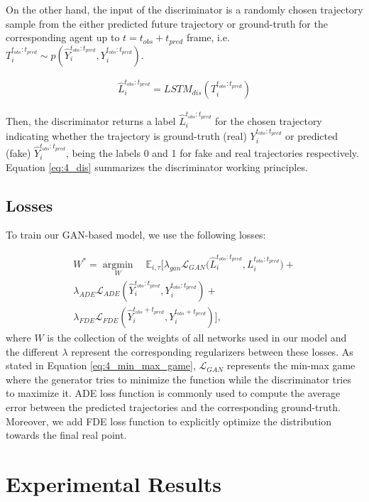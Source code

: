 On the other hand, the input of the discriminator is a randomly chosen trajectory sample from the either predicted future trajectory or ground-truth for the corresponding agent up to $t = t_{obs} + t_{pred}$ frame, i.e.  $T_i^{t_{obs}:t_{pred}}\sim p(\hat{Y}_i^{t_{obs}:t_{pred}},Y_i^{t_{obs}:t_{pred}})$.

\begin{eqnarray}
	\label{eq:4_dis}
	\hat{L}_{i}^{t_{obs}:t_{pred}} = LSTM_{dis}(T_i^{t_{obs}:t_{pred}})
\end{eqnarray}

Then, the discriminator returns a label $\hat{L}_{i}^{t_{obs}:t_{pred}}$ for the chosen trajectory indicating whether the trajectory is ground-truth (real) $Y_i^{t_{obs}:t_{pred}}$ or predicted (fake) $\hat{Y}_i^{t_{obs}:t_{pred}}$, being the labels 0 and 1 for fake and real trajectories respectively. Equation \ref{eq:4_dis} summarizes the discriminator working principles. 

\subsection{Losses}
\label{subsec:5_losses}

To train our \ac{GAN}-based model, we use the following losses:

\begin{eqnarray}
	\label{eq:obj}
	W^* =\operatorname*{argmin}_W \quad\mathbb{E}_{i,\tau}[\lambda_{gan} \mathcal{L}_{GAN}\big(\hat{L}_{i}^{t_{obs}:t_{pred}}, L_{i}^{t_{obs}:t_{pred}} \big)+ \nonumber\\
	\lambda_{ADE} \mathcal{L}_{ADE}(\hat{Y}_i^{t_{obs}:t_{pred}},Y_i^{t_{obs}:t_{pred}})+ \nonumber\\
	\lambda_{FDE} \mathcal{L}_{FDE}(\hat{Y}_i^{t_{obs}+t_{pred}},Y_i^{t_{obs}+t_{pred}})],
\end{eqnarray}
%
where $W$ is the collection of the weights of all networks used in our model and the different $\lambda$ represent the corresponding regularizers between these losses. As stated in Equation \ref{eq:4_min_max_game}, $\mathcal{L}_{GAN}$ represents the min-max game where the generator tries to minimize the function while the discriminator tries to maximize it. ADE loss function is commonly used to compute the average error between the predicted trajectories and the corresponding ground-truth. Moreover, we add FDE loss function to explicitly optimize the distribution towards the final real point.

\section{Experimental Results}
\label{sec:5_experimental_results}

